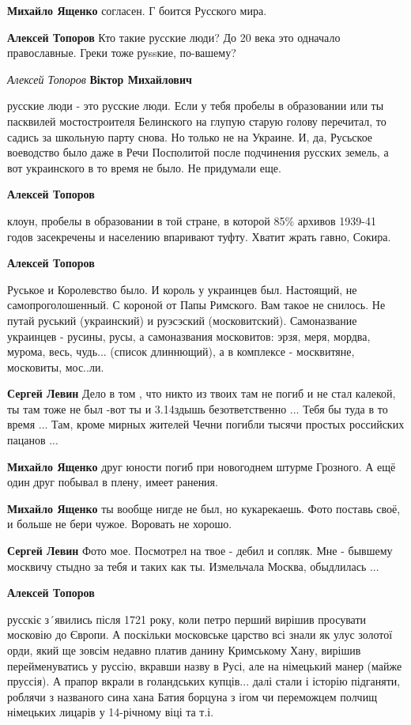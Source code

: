 \begin{itemize}
\begin{itemize}
\textbf{Михайло Ященко} согласен. Г боится Русского мира.

\textbf{Алексей Топоров} Кто такие русские люди? До 20 века это одначало православные. Греки тоже руssкие, по-вашему?

\emph{Алексей Топоров}
\textbf{Віктор Михайлович} 

русские люди - это русские люди. Если у тебя пробелы в образовании или ты
пасквилей мостостроителя Белинского на глупую старую голову перечитал, то
садись за школьную парту снова. Но только не на Украине. И, да, Русьское
воеводство было даже в Речи Посполитой после подчинения русских земель, а вот
украинского в то время не было. Не придумали еще.

\textbf{Алексей Топоров} 

клоун, пробелы в образовании в той стране, в которой 85\% архивов 1939-41 годов
засекречены и населению впаривают туфту. Хватит жрать гавно, Сокира.


\textbf{Алексей Топоров} 

Руськое и Королевство было. И король у украинцев был. Настоящий, не
самопроголошенный. С короной от Папы Римского. Вам такое не снилось. Не путай
руський (украинский) и руэсэский (московитский). Самоназвание украинцев -
русины, русы, а самоназвания московитов: эрзя, меря, мордва, мурома, весь,
чудь... (список длиннющий), а в комплексе - москвитяне, московиты, мос..ли.

\textbf{Сергей Левин} Дело в том , что никто из твоих там не погиб и не стал калекой, ты там тоже не был -вот ты и 3.14здышь безответственно ... Тебя бы туда в то время ... Там, кроме мирных жителей Чечни погибли тысячи простых российских пацанов ...

\textbf{Михайло Ященко} друг юности погиб при новогоднем штурме Грозного. А ещё один друг побывал в плену, имеет ранения.

\textbf{Михайло Ященко} ты вообще нигде не был, но кукарекаешь.
Фото поставь своё, и больше не бери чужое. Воровать не хорошо.

\textbf{Сергей Левин} Фото мое. Посмотрел на твое - дебил и сопляк. Мне - бывшему москвичу стыдно за тебя и таких как ты. Измельчала Москва, обыдлилась ...

\textbf{Алексей Топоров} 

русскіє з´явились після 1721 року, коли петро перший вирішив просувати московію
до Європи. А поскільки московське царство всі знали як улус золотої орди, який
ще зовсім недавно платив данину Кримському Хану, вирішив перейменуватись у
руссію, вкравши назву в Русі, але на німецький манер (майже пруссія). А прапор
вкрали в голандських купців... далі стали і історію підганяти, роблячи з
названого сина хана Батия борцуна з ігом чи переможцем полчищ німецьких лицарів
у 14-річному віці та т.і.



\end{itemize}
\end{itemize}
